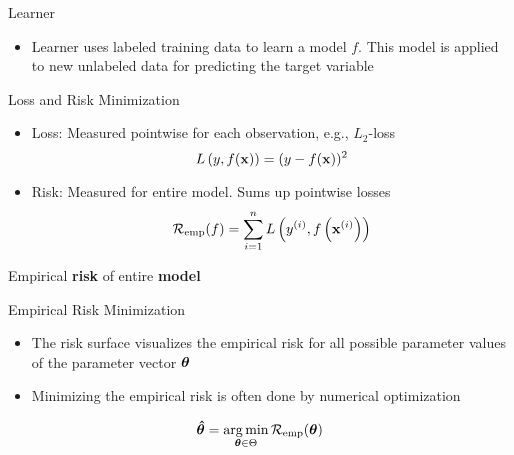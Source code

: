 \documentclass[11pt,compress,t,notes=noshow, xcolor=table]{beamer}
\begin{document}
\begin{frame}{Learner}
\begin{itemize}
\item Learner uses labeled training data to learn a model $f$. This model is applied to new unlabeled data for predicting the target variable
\end{itemize}
\end{frame}


\begin{frame}{Loss and Risk Minimization}
\begin{itemize}
  \item Loss: Measured pointwise for each observation, e.g., $L_2$-loss
  $$
  L\left(y, f(\mathbf{x})\right) = (y - f(\mathbf{x}))^2
  $$
  \item Risk: Measured for entire model. Sums up pointwise losses
  $$
  \mathcal{R}_{\text{emp}}(f) = \sum\limits_{i=1}^n L\left(y^{(i)}, f\left(\mathbf{x}^{(i)}\right)\right)
  $$
\end{itemize}
\vfill
{}
{
\center \small Empirical \textbf{risk} of entire \textbf{model}
}
\end{frame}


\begin{frame2}[small]{Empirical Risk Minimization}
\begin{itemize}
\item The risk surface visualizes the empirical risk for all possible parameter values of the parameter vector $\bm{\theta}$
\item Minimizing the empirical risk is often done by numerical optimization
\end{itemize}
$$
\bm{\hat\theta} = \mathop{\mathrm{arg\,min}}_{\bm{\theta} \in \Theta} \mathcal{R}_{\text{emp}}(\bm{\theta})
$$
\end{frame2}

\endlecture
\end{document}
